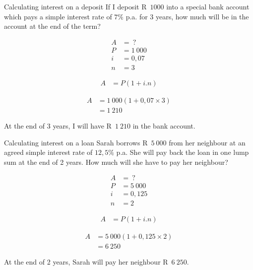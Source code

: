 \begin{wex}{Calculating interest on a deposit}{
    If I deposit R~$1 000$ into a special bank account which pays a simple interest rate of $7\%$ p.a. for 3 years, how much will be in the account at the end of the term?}{

    \begin{align*}
	A &= ~?\\
	P &= 1~000\\
	i &= 0,07\\
	n &= 3
    \end{align*}
    
    \begin{align*}
	A &= P(1 + i . n)
    \end{align*}

    \begin{align*}
	A &= 1~000(1 + 0,07 \times 3)\\
	  &= 1~210
    \end{align*}

    At the end of 3 years, I will have R~$1~210$ in the bank account.
    }
\end{wex}


\begin{wex}{Calculating interest on a loan}{
    Sarah borrows R~$5~000$ from her neighbour at an agreed simple interest rate of $12,5\%$ p.a. She will pay back the loan in one lump sum at the end of 2 years. How much will she have to pay her neighbour?}{

    \begin{align*}
	A &= ~?\\
	P &= 5~000\\
	i &= 0,125\\
	n &= 2
    \end{align*}

    \begin{align*}
	A &= P(1 + i . n)
    \end{align*}

    \begin{align*}
	A &= 5~000(1 + 0,125 \times 2)\\
	  &= 6~250
    \end{align*}

    At the end of 2 years, Sarah will pay her neighbour R~$6~250$.
    }
\end{wex}


